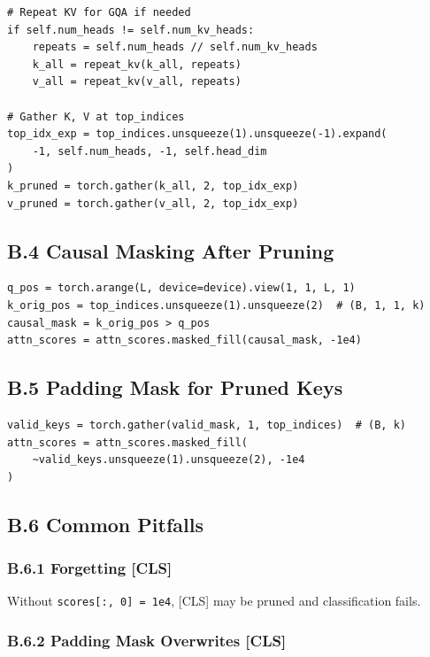 {\begin{lstlisting}
# Repeat KV for GQA if needed
if self.num_heads != self.num_kv_heads:
    repeats = self.num_heads // self.num_kv_heads
    k_all = repeat_kv(k_all, repeats)
    v_all = repeat_kv(v_all, repeats)

# Gather K, V at top_indices
top_idx_exp = top_indices.unsqueeze(1).unsqueeze(-1).expand(
    -1, self.num_heads, -1, self.head_dim
)
k_pruned = torch.gather(k_all, 2, top_idx_exp)
v_pruned = torch.gather(v_all, 2, top_idx_exp)
\end{lstlisting}

\subsection{B.4 Causal Masking After Pruning}

\begin{lstlisting}
q_pos = torch.arange(L, device=device).view(1, 1, L, 1)
k_orig_pos = top_indices.unsqueeze(1).unsqueeze(2)  # (B, 1, 1, k)
causal_mask = k_orig_pos > q_pos
attn_scores = attn_scores.masked_fill(causal_mask, -1e4)
\end{lstlisting}

\subsection{B.5 Padding Mask for Pruned Keys}

\begin{lstlisting}
valid_keys = torch.gather(valid_mask, 1, top_indices)  # (B, k)
attn_scores = attn_scores.masked_fill(
    ~valid_keys.unsqueeze(1).unsqueeze(2), -1e4
)
\end{lstlisting}

\subsection{B.6 Common Pitfalls}

\subsubsection{B.6.1 Forgetting [CLS]}

Without \texttt{scores[:, 0] = 1e4}, [CLS] may be pruned and classification fails.

\subsubsection{B.6.2 Padding Mask Overwrites [CLS]}

}
